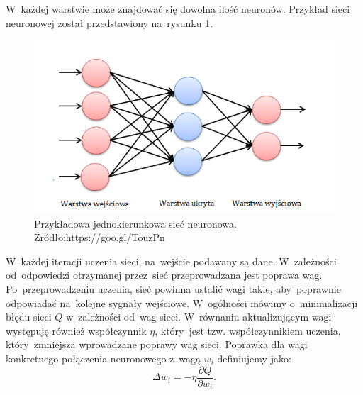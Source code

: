 \noindent
W~każdej warstwie może znajdować się dowolna ilość neuronów. Przykład sieci neuronowej został przedstawiony na~rysunku \ref{net}.
\begin{figure}[ht!]
\centering
\includegraphics{res/exampleNet.png}
\caption[Caption for LOF]{Przykładowa jednokierunkowa sieć neuronowa. Źródło:{https://goo.gl/TouzPn}\label{net}} 
\end{figure}
\noindent
W~każdej iteracji uczenia sieci, na~wejście podawany są dane. W~zależności od~odpowiedzi otrzymanej przez~sieć przeprowadzana jest poprawa wag. Po~przeprowadzeniu uczenia, sieć powinna ustalić wagi takie, aby~poprawnie odpowiadać na~kolejne sygnały wejściowe. W~ogólności mówimy o~minimalizacji błędu sieci $Q$ w~zależności od~wag sieci. W~równaniu aktualizującym wagi występuję również współczynnik $\eta$, który~jest tzw. współczynnikiem uczenia, który~zmniejsza wprowadzane poprawy wag sieci. Poprawka dla wagi konkretnego połączenia neuronowego z~wagą $w_i$ definiujemy jako:
\begin{equation}\label{deltaRule}
\Delta w_i = - \eta \frac{\partial Q}{\partial w_i}.
\end{equation}
